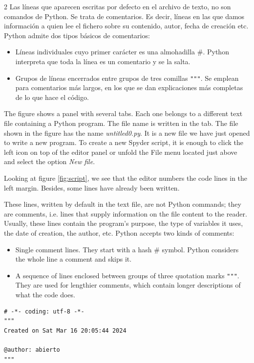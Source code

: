 \begin{paracol}{2}
Las líneas que aparecen escritas por defecto en el archivo de texto, no son comandos de Python. Se trata de comentarios. Es decir, líneas en las que damos información a quien lee el fichero sobre su contenido, autor, fecha de creación etc. Python admite dos tipos básicos de comentarios:
\begin{itemize}
    \item Líneas individuales cuyo primer carácter es una almohadilla \#. Python interpreta que toda la línea es un comentario y se la salta.
    \item Grupos de líneas encerrados entre grupos de tres comillas \verb|"""|. Se emplean para comentarios más largos, en los que se dan explicaciones más completas de lo que hace el código.
\end{itemize}
\switchcolumn
The figure shows a panel with several tabs. Each one belongs to a different text file containing a Python program. The file name is written in the tab. The file shown in the figure has the name \emph{untitled0.py}. It is a new file we have just opened to write a new program. To create a new Spyder script, it is enough to click the left icon on top of the editor panel or unfold the File menu located just above and select the option \emph{New file}.

Looking at figure \ref{fig:script}, we see that the editor numbers the code lines in the left margin. Besides, some lines have already been written.

These lines, written by default in the text file, are not Python commands; they are comments, i.e. lines that supply information on the file content to the reader. Usually, these lines contain the program's purpose, the type of variables it uses, the date of creation, the author, etc. Python accepts two kinds of comments:
\begin{itemize}
    \item Single comment lines. They start with a hash \#  symbol. Python considers the whole line a comment and skips it.
    \item A sequence of lines enclosed between groups of three quotation marks \verb|"""|. They are used for lengthier comments, which contain longer descriptions of what the code does. 
\end{itemize}
\end{paracol}


\begin{verbatim}
# -*- coding: utf-8 -*-
"""
Created on Sat Mar 16 20:05:44 2024

@author: abierto
"""
\end{verbatim}

